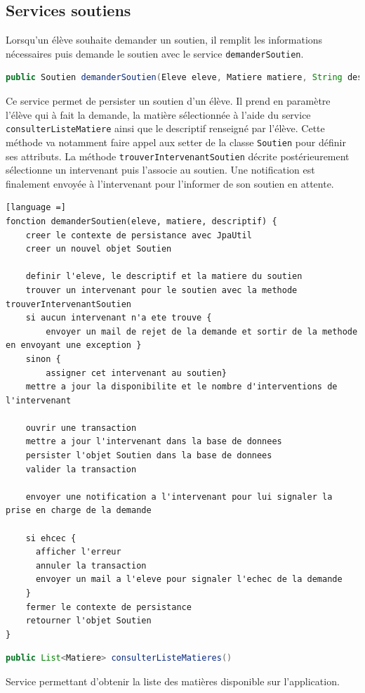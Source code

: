 \subsection{Services soutiens}
Lorsqu'un élève souhaite demander un soutien, il remplit les informations nécessaires puis demande le soutien avec le service \texttt{demanderSoutien}.
\begin{lstlisting}[language = Java]
public Soutien demanderSoutien(Eleve eleve, Matiere matiere, String descriptif)
\end{lstlisting}
Ce service permet de persister un soutien d'un élève. Il prend en paramètre l'élève qui à fait la demande, la matière sélectionnée à l'aide du service \texttt{consulterListeMatiere} ainsi que le descriptif renseigné par l'élève. Cette méthode va notamment faire appel aux setter de la classe \texttt{Soutien} pour définir ses attributs. La méthode \texttt{trouverIntervenantSoutien} décrite postérieurement sélectionne un intervenant puis l'associe au soutien. Une notification est finalement envoyée à l'intervenant pour l'informer de son soutien en attente.
\begin{lstlisting}[language =]
fonction demanderSoutien(eleve, matiere, descriptif) {
    creer le contexte de persistance avec JpaUtil
    creer un nouvel objet Soutien
      
    definir l'eleve, le descriptif et la matiere du soutien
    trouver un intervenant pour le soutien avec la methode trouverIntervenantSoutien
    si aucun intervenant n'a ete trouve {
        envoyer un mail de rejet de la demande et sortir de la methode en envoyant une exception }
    sinon {
        assigner cet intervenant au soutien} 
    mettre a jour la disponibilite et le nombre d'interventions de l'intervenant
      
    ouvrir une transaction
    mettre a jour l'intervenant dans la base de donnees
    persister l'objet Soutien dans la base de donnees
    valider la transaction
      
    envoyer une notification a l'intervenant pour lui signaler la prise en charge de la demande
    
    si ehcec {
      afficher l'erreur
      annuler la transaction
      envoyer un mail a l'eleve pour signaler l'echec de la demande
    }
    fermer le contexte de persistance
    retourner l'objet Soutien
}
\end{lstlisting}

\begin{lstlisting}[language = Java]
public List<Matiere> consulterListeMatieres()
\end{lstlisting}
Service permettant d'obtenir la liste des matières disponible sur l'application.

